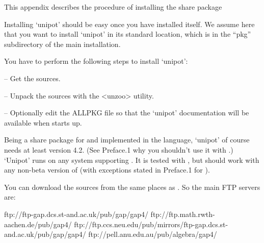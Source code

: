 

This appendix describes the procedure of installing the share package

Installing `unipot' should be easy once you have installed {\GAP} itself.
We assume here that you want to install `unipot' in its standard
location, which is in the ``pkg'' subdirectory of the main {}
installation.



You have to perform the following steps to install `unipot':

\beginlist
\item{--} Get the sources.
\item{--} Unpack the sources with the <unzoo> utility.
\item{--} Optionally edit the ALLPKG file so that the `unipot'
     documentation will be available when {\GAP} starts up.
\endlist                                                                                                      



Being a share package for {} and implemented in the {}
language, `unipot' of course needs at least {\GAP} version 4.2.
(See Preface.1 why you shouldn't use it with {}.)
`Unipot' runs on any system supporting {}. It is tested with {},
but should work with any non-beta version of {} (with exceptions
stated in Preface.1 for {}).



You can download the sources from the same places as {\GAP}. So the main
FTP servers are:

\begintt
ftp://ftp-gap.dcs.st-and.ac.uk/pub/gap/gap4/
ftp://ftp.math.rwth-aachen.de/pub/gap4/
ftp://ftp.ccs.neu.edu/pub/mirrors/ftp-gap.dcs.st-and.ac.uk/pub/gap/gap4/
ftp://pell.anu.edu.au/pub/algebra/gap4/
\endtt

